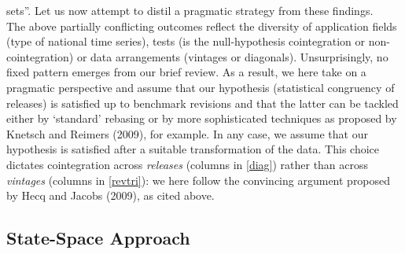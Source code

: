 \documentclass[11pt]{article}
\begin{document}
sets''. Let us now attempt to distil  a pragmatic strategy from these findings.\\

The above partially conflicting outcomes reflect the diversity of application fields (type of national time series), tests (is the null-hypothesis cointegration or non-cointegration) or data arrangements (vintages or diagonals). Unsurprisingly, no fixed pattern emerges from our brief review. As a result, we here take on a pragmatic perspective and assume that our hypothesis (statistical congruency of releases) is satisfied up to benchmark revisions and that the latter can be tackled either by `standard' rebasing or by more sophisticated techniques as proposed by Knetsch and Reimers (2009), for example. In any case, we assume that our hypothesis is satisfied after a suitable transformation of the data. This choice dictates cointegration across \emph{releases} (columns in \ref{diag}) rather than across \emph{vintages} (columns in \ref{revtri}): we here follow the convincing argument proposed by Hecq and Jacobs (2009), as cited above.





\subsection{State-Space Approach}\label{ssa}
\end{document}

